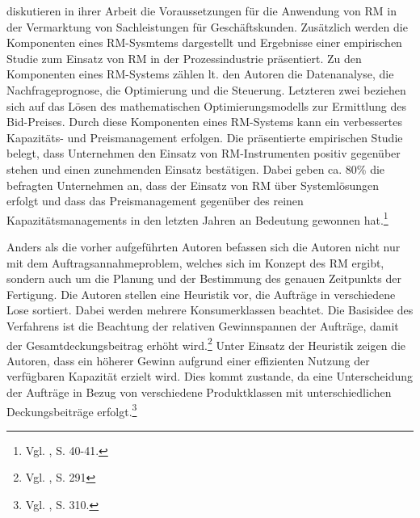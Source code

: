 \cite{kolisch2006revenue} diskutieren in ihrer Arbeit die Voraussetzungen für die Anwendung von RM in der Vermarktung von Sachleistungen für Geschäftskunden. Zusätzlich werden die Komponenten eines RM-Sysmtems dargestellt und Ergebnisse einer empirischen Studie zum Einsatz von RM in der Prozessindustrie präsentiert. Zu den Komponenten eines RM-Systems zählen lt. den Autoren die Datenanalyse, die Nachfrageprognose, die Optimierung und die Steuerung. Letzteren zwei beziehen sich auf das Lösen des mathematischen Optimierungsmodells zur Ermittlung des Bid-Preises. Durch diese Komponenten eines RM-Systems kann ein verbessertes Kapazitäts- und Preismanagement erfolgen. Die präsentierte empirischen Studie belegt, dass Unternehmen den Einsatz von RM-Instrumenten positiv gegenüber stehen und einen zunehmenden Einsatz bestätigen. Dabei geben ca. 80\% die befragten Unternehmen an, dass der Einsatz von RM über Systemlösungen erfolgt und dass das Preismanagement gegenüber des reinen Kapazitätsmanagements in den letzten Jahren an Bedeutung gewonnen hat.\footnote{Vgl. \cite{kolisch2006revenue}, S. 40-41.}

Anders als die vorher aufgeführten Autoren befassen sich die Autoren \cite{DECI:DECI074} nicht nur mit dem Auftragsannahmeproblem, welches sich im Konzept des RM ergibt, sondern auch um die Planung und der Bestimmung des genauen Zeitpunkts der Fertigung. Die Autoren stellen eine Heuristik vor, die Aufträge in verschiedene Lose sortiert. Dabei werden mehrere Konsumerklassen beachtet. Die Basisidee des Verfahrens ist die Beachtung der relativen Gewinnspannen der Aufträge, damit der Gesamtdeckungsbeitrag erhöht wird.\footnote{Vgl. \cite{DECI:DECI074}, S. 291} Unter Einsatz der Heuristik zeigen die Autoren, dass ein höherer Gewinn aufgrund einer effizienten Nutzung der verfügbaren Kapazität erzielt wird. Dies kommt zustande, da eine Unterscheidung der Aufträge in Bezug von verschiedene Produktklassen mit unterschiedlichen Deckungsbeiträge erfolgt.\footnote{Vgl. \cite{DECI:DECI074}, S. 310.}

